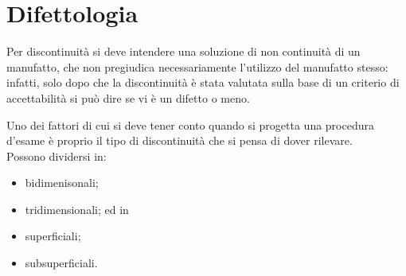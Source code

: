 \section{Difettologia}

Per discontinuità si deve intendere una soluzione di non continuità di un manufatto, che non pregiudica necessariamente l’utilizzo del manufatto stesso: infatti, solo dopo che la discontinuità è stata valutata sulla base di un criterio di accettabilità si può dire se vi è un difetto o meno.

Uno dei fattori di cui si deve tener conto quando si progetta una procedura d’esame è proprio il tipo di discontinuità che si pensa di dover rilevare.\\
Possono dividersi in:
\begin{itemize}
    \item bidimenisonali;
    \item tridimensionali;
    ed in
    \item superficiali;
    \item subsuperficiali.
\end{itemize}


